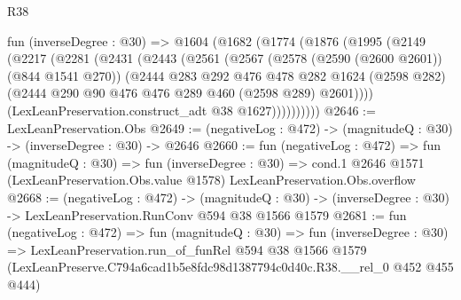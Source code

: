 \begin{lexlean}{R38}
\begin{coremodule}
  fun (inverseDegree : @30) =>
  @1604
    (@1682
      (@1774
        (@1876
          (@1995
            (@2149
              (@2217
                (@2281
                  (@2431
                    (@2443
                      (@2561
                        (@2567
                          (@2578 (@2590 (@2600 @2601)) (@844 @1541 @270))
                          (@2444
                            @283
                            @292
                            @476
                            @478
                            @282
                            @1624
                            (@2598 @282)
                            (@2444 @290 @90 @476 @476 @289 @460 (@2598 @289) @2601))))
                      (LexLeanPreservation.construct_adt @38 @1627))))))))))
@2646 := LexLeanPreservation.Obs
@2649 := (negativeLog : @472) -> (magnitudeQ : @30) -> (inverseDegree : @30) -> @2646
@2660 := fun (negativeLog : @472) =>
  fun (magnitudeQ : @30) =>
  fun (inverseDegree : @30) =>
  cond.{1} @2646 @1571 (LexLeanPreservation.Obs.value @1578) LexLeanPreservation.Obs.overflow
@2668 := (negativeLog : @472) ->
  (magnitudeQ : @30) -> (inverseDegree : @30) -> LexLeanPreservation.RunConv @594 @38 @1566 @1579
@2681 := fun (negativeLog : @472) =>
  fun (magnitudeQ : @30) =>
  fun (inverseDegree : @30) =>
  LexLeanPreservation.run_of_funRel
    @594
    @38
    @1566
    @1579
    (LexLeanPreserve.C794a6cad1b5e8fdc98d1387794c0d40c.R38.__rel_0 @452 @455 @444)
\end{coremodule}
\end{lexlean}
